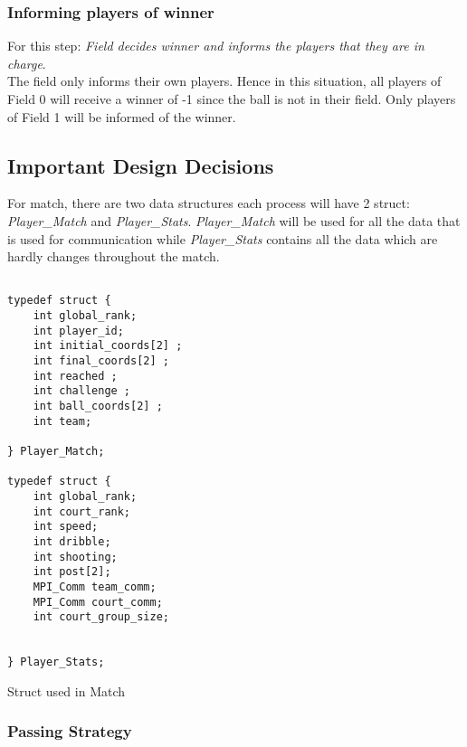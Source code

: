 \documentclass{article}
\begin{document}
\subsubsection{Informing players of winner}
For this step: \textit{Field decides winner and informs the players that they are in charge}.\\
The field only informs their own players. Hence in this situation, all players of Field 0 will receive a winner of -1 since the ball is not in their field. Only players of Field 1 will be informed of the winner.

\subsection{Important Design Decisions}
For match, there are two data structures each process will have 2 struct: \textit{Player\_Match} and \textit{Player\_Stats}.  \textit{Player\_Match} will be used for all the data that is used for communication while \textit{Player\_Stats} contains all the data which are hardly changes throughout the match.

\begin{program}[H]
\begin{verbatim}

typedef struct {
    int global_rank;
    int player_id;
    int initial_coords[2] ;
    int final_coords[2] ;
    int reached ;
    int challenge ;
    int ball_coords[2] ; 
    int team;

} Player_Match;

typedef struct {
    int global_rank;
    int court_rank;    
    int speed;
    int dribble;
    int shooting;
    int post[2];
    MPI_Comm team_comm; 
    MPI_Comm court_comm;
    int court_group_size;


} Player_Stats;
\end{verbatim}
  \caption{Struct used in Match}
\end{program}



\subsubsection{Passing Strategy}
\end{document}
